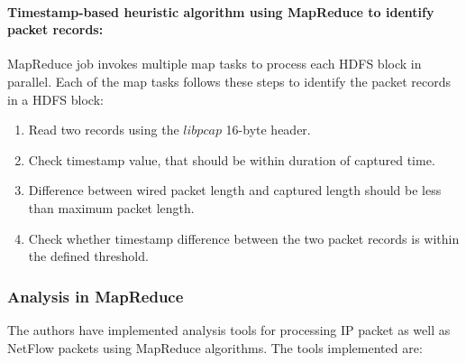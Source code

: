       \paragraph{Timestamp-based heuristic algorithm using MapReduce to identify packet records:}
	MapReduce job invokes multiple map tasks to process each	 HDFS block in parallel. 
	Each of the map tasks follows these steps to identify the packet records in a HDFS block:
	\begin{enumerate}
	 \item Read two records using the $libpcap$ 16-byte header.
	 \item Check timestamp value, that should be within duration of captured time.
	 \item Difference between wired packet length and captured length should be less than maximum packet length.
	 \item Check whether timestamp difference between the two packet records is within the defined
	 threshold. 
	\end{enumerate}
	
	\subsubsection{Analysis in MapReduce}
	The authors have %
	implemented  analysis tools for processing IP packet as well as NetFlow packets using MapReduce algorithms. The tools implemented are:
	
